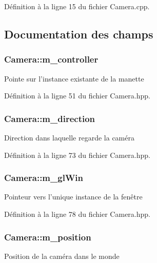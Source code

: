 Définition à la ligne 15 du fichier Camera.\+cpp.



\subsection{Documentation des champs}
\hypertarget{classCamera_a879e38247f44c717796f38a501d335e3}{
\subsubsection[{m\+\_\+controller}]{\setlength{\rightskip}{0pt plus 5cm}Camera\+::m\+\_\+controller}}\label{classCamera_a879e38247f44c717796f38a501d335e3}
{\ttfamily Pointe} sur l'instance existante de la manette 

Définition à la ligne 51 du fichier Camera.\+hpp.

\hypertarget{classCamera_a64d1bf3cfff83eeb294a6cf53a0d4255}{
\subsubsection[{m\+\_\+direction}]{\setlength{\rightskip}{0pt plus 5cm}Camera\+::m\+\_\+direction}}\label{classCamera_a64d1bf3cfff83eeb294a6cf53a0d4255}
{\ttfamily Direction} dans laquelle regarde la caméra 

Définition à la ligne 73 du fichier Camera.\+hpp.

\hypertarget{classCamera_a97abe5fea87690fbb00d920ecf5fcce8}{
\subsubsection[{m\+\_\+gl\+Win}]{\setlength{\rightskip}{0pt plus 5cm}Camera\+::m\+\_\+gl\+Win}}\label{classCamera_a97abe5fea87690fbb00d920ecf5fcce8}
{\ttfamily Pointeur} vers l'unique instance de la fenêtre 

Définition à la ligne 78 du fichier Camera.\+hpp.

\hypertarget{classCamera_a2674b50120e3bafbab54b53e4313d54d}{
\subsubsection[{m\+\_\+position}]{\setlength{\rightskip}{0pt plus 5cm}Camera\+::m\+\_\+position}}\label{classCamera_a2674b50120e3bafbab54b53e4313d54d}
{\ttfamily Position} de la caméra dans le monde 

